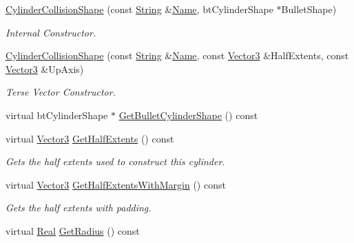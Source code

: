 \begin{DoxyCompactItemize}
\hyperlink{classMezzanine_1_1CylinderCollisionShape_a5f1765f49d8c7f48df29264314bd8c5a}{CylinderCollisionShape} (const \hyperlink{namespaceMezzanine_acf9fcc130e6ebf08e3d8491aebcf1c86}{String} \&\hyperlink{classMezzanine_1_1CollisionShape_aac524c5c56fa4d158bc071f8aecfbe79}{Name}, btCylinderShape $\ast$BulletShape)
\begin{DoxyCompactList}\small\item\em Internal Constructor. \item\end{DoxyCompactList}\item 
\hyperlink{classMezzanine_1_1CylinderCollisionShape_a541f91adac5f553466fc3e2d2445ed78}{CylinderCollisionShape} (const \hyperlink{namespaceMezzanine_acf9fcc130e6ebf08e3d8491aebcf1c86}{String} \&\hyperlink{classMezzanine_1_1CollisionShape_aac524c5c56fa4d158bc071f8aecfbe79}{Name}, const \hyperlink{classMezzanine_1_1Vector3}{Vector3} \&HalfExtents, const \hyperlink{classMezzanine_1_1Vector3}{Vector3} \&UpAxis)
\begin{DoxyCompactList}\small\item\em Terse Vector Constructor. \item\end{DoxyCompactList}\item 
virtual btCylinderShape $\ast$ \hyperlink{classMezzanine_1_1CylinderCollisionShape_a7caaf49dfee6f543aaca4c1cf6fbf5c5}{GetBulletCylinderShape} () const 
\item 
virtual \hyperlink{classMezzanine_1_1Vector3}{Vector3} \hyperlink{classMezzanine_1_1CylinderCollisionShape_a4184b98934573f5dae1ed34578dc18c0}{GetHalfExtents} () const 
\begin{DoxyCompactList}\small\item\em Gets the half extents used to construct this cylinder. \item\end{DoxyCompactList}\item 
virtual \hyperlink{classMezzanine_1_1Vector3}{Vector3} \hyperlink{classMezzanine_1_1CylinderCollisionShape_a9b16715071eaa8827162a8ea36132a23}{GetHalfExtentsWithMargin} () const 
\begin{DoxyCompactList}\small\item\em Gets the half extents with padding. \item\end{DoxyCompactList}\item 
virtual \hyperlink{namespaceMezzanine_a726731b1a7df72bf3583e4a97282c6f6}{Real} \hyperlink{classMezzanine_1_1CylinderCollisionShape_a3f62cb0c30122784088e0f9cbbf3c798}{GetRadius} () const 

\end{DoxyCompactItemize}
